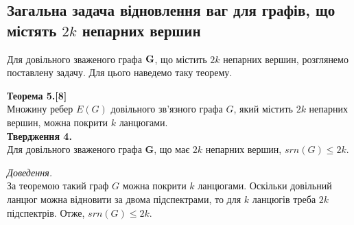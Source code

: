 \subsection{Загальна задача відновлення ваг для графів, що містять $2k$ непарних вершин}

Для довільного зваженого графа ${\bf G}$, що містить $2k$ непарних вершин, розглянемо поставлену задачу. Для цього наведемо таку теорему.

 \textbf{Теорема 5.[8]}\\
 Множину ребер $E(G)$ довільного зв'язного графа $G$, який містить $2k$ непарних вершин, можна покрити $k$ ланцюгами.\\
 
 \textbf{Твердження 4.}\\
Для довільного зваженого графа \textbf{G}, що має $2k$ непарних вершин, $srn(G)\leq 2k$.

\textit{Доведення.}\\
За теоремою такий граф $G$ можна покрити $k$ ланцюгами. Оскільки довільний ланцюг можна відновити за двома підспектрами, то для $k$ ланцюгів треба $2k$ підспектрів. Отже, $srn(G)\leq 2k$.
 